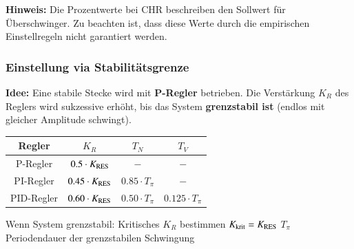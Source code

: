 \textbf{Hinweis:} Die Prozentwerte bei CHR beschreiben den Sollwert für Überschwinger.
Zu beachten ist, dass diese Werte durch die empirischen Einstellregeln nicht garantiert werden.


\subsubsection{Einstellung via Stabilitätsgrenze}


\textbf{Idee:} Eine stabile Stecke wird mit \textbf{P-Regler} betrieben. Die Verstärkung $K_R$ des Reglers wird sukzessive erhöht,
bis das System \textbf{grenzstabil ist} (endlos mit gleicher Amplitude schwingt).

\begin{minipage}[c]{0.55\columnwidth}
    \begin{tabular}{|c | c | c | c|}
        \toprule
        Regler      & $K_R$                     & $T_N$                 & $T_V$                 \\
        \midrule
        P-Regler    & $0.5 \cdot K_{\rm RES}$   & $-$                   & $-$                   \\
        \midrule
        PI-Regler   & $0.45 \cdot K_{\rm RES}$  & $0.85 \cdot T_{\pi}$  & $-$                   \\
        \midrule
        PID-Regler  & $0.60 \cdot K_{\rm RES}$  & $0.50 \cdot T_{\pi}$  & $0.125 \cdot T_{\pi}$ \\
        \bottomrule
    \end{tabular}
\end{minipage}
\hfill
\begin{minipage}[c]{0.42\columnwidth}
    \begin{center}
        \textbf{}
    \end{center}

    \begin{outline}
        \1 Wenn System grenzstabil: Kritisches $K_R$ bestimmen
            \2 $K_{\rm krit} = K_{\rm RES}$
        \1 $T_{\pi}$ Periodendauer der grenzstabilen Schwingung 
    \end{outline}
\end{minipage}




